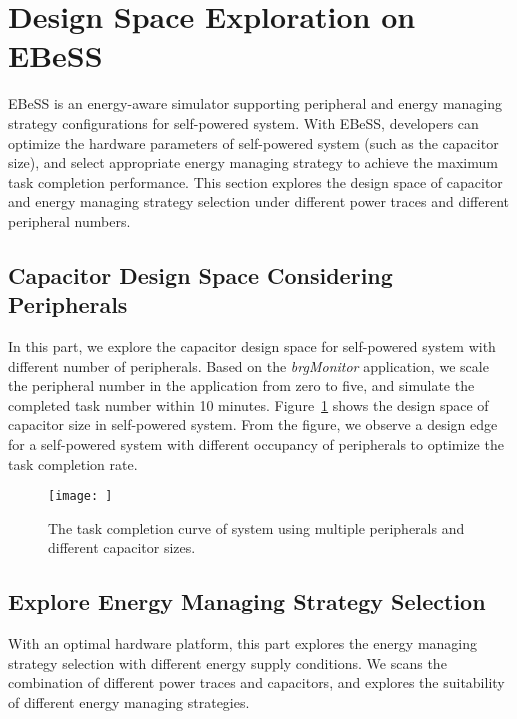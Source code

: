 \section{Design Space Exploration on EBeSS}	\label{sec:exp}
%
EBeSS is an energy-aware simulator supporting peripheral and energy managing strategy configurations for self-powered system.
With EBeSS, developers can optimize the hardware parameters of self-powered system (such as the capacitor size), and select appropriate energy managing strategy to achieve the maximum task completion performance. 
This section explores the design space of capacitor and energy managing strategy selection under different power traces and different peripheral numbers.

\subsection{Capacitor Design Space Considering Peripherals}
%
In this part, we explore the capacitor design space for self-powered system with different number of peripherals. 
Based on the \emph{brgMonitor} application, we scale the peripheral number in the application from zero to five, and simulate the completed task number within 10 minutes.
Figure~\ref{fig:CapVsBenchmark} shows the design space of capacitor size in self-powered system.
From the figure, we observe a design edge for a self-powered system with different occupancy of peripherals to optimize the task completion rate.

\begin{figure}[!htpb]
	\centering
	\vspace{-5pt}
	\texttt{[image: ]}
	\vspace{-5pt}
	\caption{The task completion curve of system using multiple peripherals and different capacitor sizes.}	\label{fig:CapVsBenchmark}
\end{figure}

\subsection{Explore Energy Managing Strategy Selection}
%
With an optimal hardware platform, this part explores the energy managing strategy selection with different energy supply conditions.
We scans the combination of different power traces and capacitors, and explores the suitability of different energy managing strategies.

